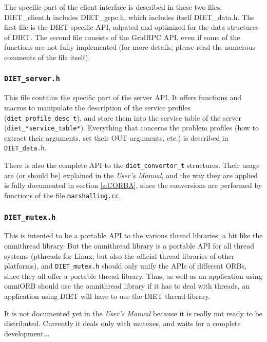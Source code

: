 The specific part of the client interface is described in these two files.
\textsf{DIET\_client.h} includes \textsf{DIET\_grpc.h}, which includes itself
\textsf{DIET\_data.h}.
The first file is the DIET specific API, adpated and optimized for the data
structures of DIET. The second file consists of the GridRPC API, even if some of
the functions are not fully implemented (for more details, please read the
numerous comments of the file itself).


\subsubsection{\tt DIET\_server.h}

This file contains the specific part of the server API.
It offers functions and macros to manipulate the description of the service
profiles (\verb+diet_profile_desc_t+), and store them into the service table of
the server (\verb+diet_*service_table*+). Everything that concerns the problem
profiles (how to extract their arguments, set their OUT arguments, etc.) is
described in \texttt{DIET\_data.h}.


There is also the complete API to the \texttt{diet\_convertor\_t} structures.
Their usage are (or should be) explained in the \textit{User's Manual}, and the
way they are applied is fully documented in section \ref{s:CORBA}, since the
conversions are performed by functions of the file \texttt{marshalling.cc}.

\subsubsection{\tt DIET\_mutex.h} 

This is intented to be a portable API to the various thread libraries, a bit
like the \textsf{omnithread} library. But the \textsf{omnithread} library is a
portable API for all thread systems (pthreads for Linux, but also the official
thread libraries of other platforms), and {\tt DIET\_mutex.h} should only unify
the APIs of different ORBs, since they all offer a portable thread library.
Thus, as well as an application using \textsf{omniORB} should use the
\textsf{omnithread} library if it has to deal with threads, an application using
DIET will have to use the DIET thread library.

It is not documented yet in the \textit{User's Manual} because it is really not
ready to be distributed. Currently it deals only with mutexes, and waits for a
complete development...



